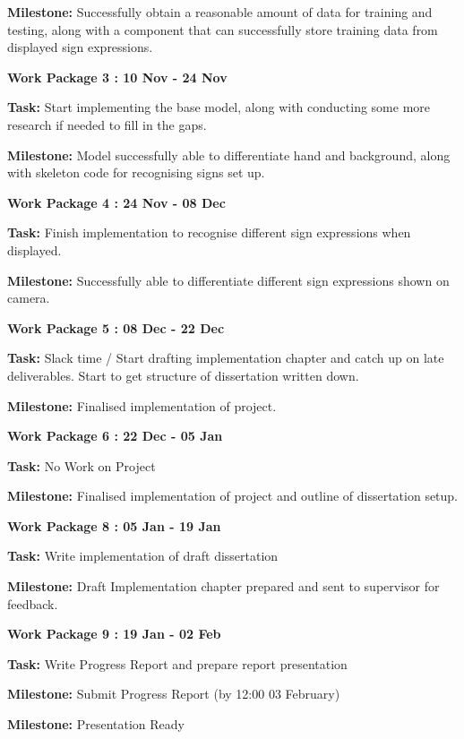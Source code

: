 \documentclass[12pt,a4paper,twoside]{article}
\begin{document}
\textbf{Milestone: }Successfully obtain a reasonable amount of data for training and testing, along with a component that can successfully store training data from displayed sign expressions.

\bigskip

\textbf{Work Package 3 : 10 Nov - 24 Nov}

\textbf{Task: }Start implementing the base model, along with conducting some more research if needed to fill in the gaps.

\textbf{Milestone: }Model successfully able to differentiate hand and background, along with skeleton code for recognising signs set up.

\bigskip

\textbf{Work Package 4 : 24 Nov - 08 Dec}

\textbf{Task: }Finish implementation to recognise different sign expressions when displayed.

\textbf{Milestone: }Successfully able to differentiate different sign expressions shown on camera.

\bigskip

\textbf{Work Package 5 : 08 Dec - 22 Dec}

\textbf{Task: }Slack time / Start drafting implementation chapter and catch up on late deliverables. Start to get structure of dissertation written down.

\textbf{Milestone: }Finalised implementation of project.

\bigskip

\textbf{Work Package 6 : 22 Dec - 05 Jan}

\textbf{Task: }No Work on Project

\textbf{Milestone: }Finalised implementation of project and outline of dissertation setup.

\bigskip

\textbf{Work Package 8 : 05 Jan - 19 Jan}

\textbf{Task: }Write implementation of draft dissertation

\textbf{Milestone: }Draft Implementation chapter prepared and sent to supervisor for feedback.

\bigskip

\textbf{Work Package 9 : 19 Jan - 02 Feb}

\textbf{Task: }Write Progress Report and prepare report presentation

\textbf{Milestone: }Submit Progress Report (by 12:00 03 February)

\textbf{Milestone: }Presentation Ready
\bigskip
\end{document}
